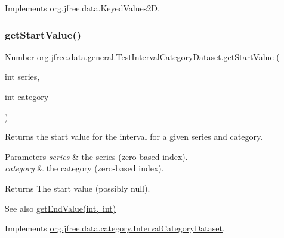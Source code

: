 Implements \mbox{\hyperlink{interfaceorg_1_1jfree_1_1data_1_1_keyed_values2_d_aeda9aab284e61f69ca6e81370e76f70a}{org.\+jfree.\+data.\+Keyed\+Values2D}}.

\mbox{\label{classorg_1_1jfree_1_1data_1_1general_1_1_test_interval_category_dataset_a53688ff9ac8176c9262fffe32280f470}} 
\subsubsection{\texorpdfstring{get\+Start\+Value()}{getStartValue()}\hspace{0.1cm}{\footnotesize\ttfamily [1/2]}}
{\footnotesize\ttfamily Number org.\+jfree.\+data.\+general.\+Test\+Interval\+Category\+Dataset.\+get\+Start\+Value (\begin{DoxyParamCaption}\item[{int}]{series,  }\item[{int}]{category }\end{DoxyParamCaption})}

Returns the start value for the interval for a given series and category.


\begin{DoxyParams}{Parameters}
{\em series} & the series (zero-\/based index). \\
\hline
{\em category} & the category (zero-\/based index).\\
\hline
\end{DoxyParams}
\begin{DoxyReturn}{Returns}
The start value (possibly {\ttfamily null}).
\end{DoxyReturn}
\begin{DoxySeeAlso}{See also}
\mbox{\hyperlink{classorg_1_1jfree_1_1data_1_1general_1_1_test_interval_category_dataset_afa3067d374cf2eb3258450ead75d2cb8}{get\+End\+Value(int, int)}} 
\end{DoxySeeAlso}


Implements \mbox{\hyperlink{interfaceorg_1_1jfree_1_1data_1_1category_1_1_interval_category_dataset_ab39752773cf77a5ccbbae7851fd16aa6}{org.\+jfree.\+data.\+category.\+Interval\+Category\+Dataset}}.

